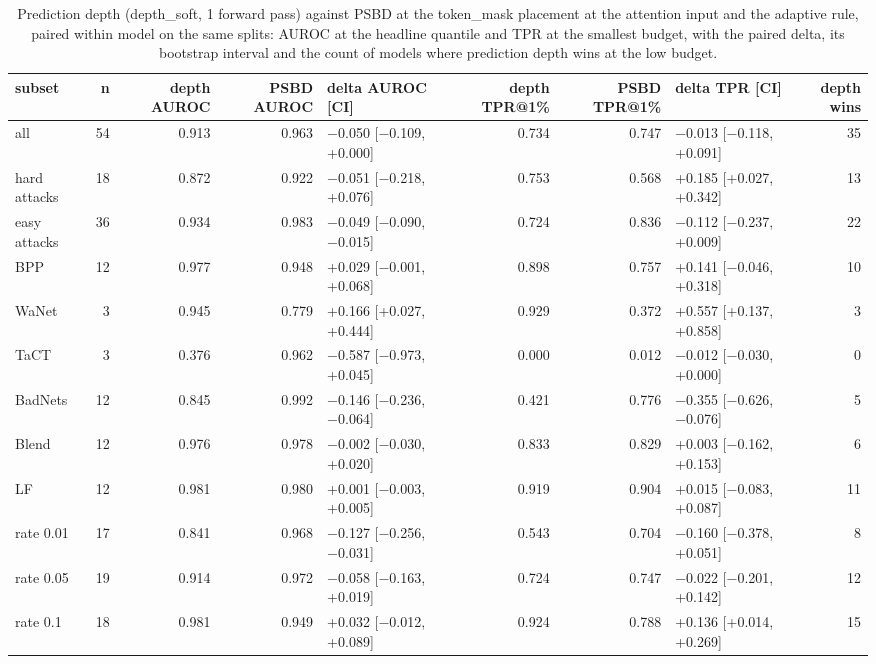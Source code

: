 \begin{table}[htbp]
\centering
\small
\caption{Prediction depth (depth\_soft, 1 forward pass) against PSBD at the token\_mask placement at the attention input and the adaptive rule, paired within model on the same splits: AUROC at the headline quantile and TPR at the smallest budget, with the paired delta, its bootstrap interval and the count of models where prediction depth wins at the low budget.}
\label{tab:prediction-depth}
\begin{adjustbox}{max width=\linewidth}
\begin{tabular}{lrrrlrrlr}
\toprule
subset & n & depth AUROC & PSBD AUROC & delta AUROC [CI] & depth TPR@1\% & PSBD TPR@1\% & delta TPR [CI] & depth wins \\
\midrule
all & 54 & 0.913 & 0.963 & $-$0.050 [$-$0.109, +0.000] & 0.734 & 0.747 & $-$0.013 [$-$0.118, +0.091] & 35 \\
hard attacks & 18 & 0.872 & 0.922 & $-$0.051 [$-$0.218, +0.076] & 0.753 & 0.568 & +0.185 [+0.027, +0.342] & 13 \\
easy attacks & 36 & 0.934 & 0.983 & $-$0.049 [$-$0.090, $-$0.015] & 0.724 & 0.836 & $-$0.112 [$-$0.237, +0.009] & 22 \\
BPP & 12 & 0.977 & 0.948 & +0.029 [$-$0.001, +0.068] & 0.898 & 0.757 & +0.141 [$-$0.046, +0.318] & 10 \\
WaNet & 3 & 0.945 & 0.779 & +0.166 [+0.027, +0.444] & 0.929 & 0.372 & +0.557 [+0.137, +0.858] & 3 \\
TaCT & 3 & 0.376 & 0.962 & $-$0.587 [$-$0.973, +0.045] & 0.000 & 0.012 & $-$0.012 [$-$0.030, +0.000] & 0 \\
BadNets & 12 & 0.845 & 0.992 & $-$0.146 [$-$0.236, $-$0.064] & 0.421 & 0.776 & $-$0.355 [$-$0.626, $-$0.076] & 5 \\
Blend & 12 & 0.976 & 0.978 & $-$0.002 [$-$0.030, +0.020] & 0.833 & 0.829 & +0.003 [$-$0.162, +0.153] & 6 \\
LF & 12 & 0.981 & 0.980 & +0.001 [$-$0.003, +0.005] & 0.919 & 0.904 & +0.015 [$-$0.083, +0.087] & 11 \\
rate 0.01 & 17 & 0.841 & 0.968 & $-$0.127 [$-$0.256, $-$0.031] & 0.543 & 0.704 & $-$0.160 [$-$0.378, +0.051] & 8 \\
rate 0.05 & 19 & 0.914 & 0.972 & $-$0.058 [$-$0.163, +0.019] & 0.724 & 0.747 & $-$0.022 [$-$0.201, +0.142] & 12 \\
rate 0.1 & 18 & 0.981 & 0.949 & +0.032 [$-$0.012, +0.089] & 0.924 & 0.788 & +0.136 [+0.014, +0.269] & 15 \\
\bottomrule
\end{tabular}
\end{adjustbox}
\end{table}
